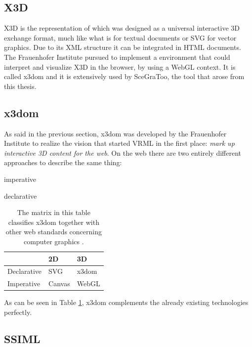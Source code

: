 \subsection{X3D}
\label{x3d} \gls{X3D} \cite{x3d} is the  representation of  which was designed as a
universal interactive \gls{3D} exchange format, much like what  is for textual
documents or \acrshort{SVG} for vector graphics. Due to its \gls{XML} structure it can be
integrated in \gls{HTML} documents. The Frauenhofer Institute pursued to
implement a environment that could interpret and visualize \gls{X3D} in the browser, by
using a \gls{WebGL} context. It is called x3dom \cite{x3dom} and it is extensively used
by SceGraToo, the tool that arose from this thesis.

\subsection{x3dom}
\label{par:x3dom}

As said in the previous section, x3dom was developed by the Frauenhofer
Institute to realize the vision that started \gls{VRML} in the first place: \emph{mark
up interactive \gls{3D} content for the web}. On the web there are two entirely
different approaches to describe the same thing:

\begin{itemize*}
  \item imperative
  \item declarative
\end{itemize*}

\begin{longtable}[c]{@{}lll@{}}
  \caption{The matrix in this table classifies x3dom together with other web standards concerning computer graphics \cite{x3dom}.\label{tab:feature_matrix}}\\
  \toprule
  & 2D & \gls{3D} \tabularnewline
  \midrule
  \endhead
  Declarative & \gls{SVG} \cite{svg} & x3dom \cite{x3dom} \tabularnewline
  Imperative  & Canvas \cite{canvas} & \gls{WebGL} \cite{webgl} \tabularnewline
  \bottomrule
\end{longtable}

As can be seen in Table \ref{tab:feature_matrix}, x3dom complements the already existing technologies
perfectly.

\clearpage
\subsection{SSIML}
\label{ssiml}

